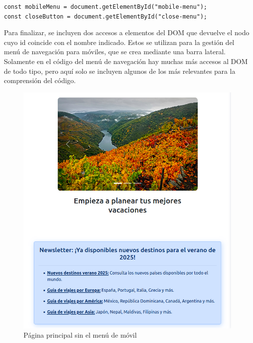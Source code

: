 \documentclass[11pt, a4paper]{book}
\begin{document}
	
	\begin{lstlisting}
const mobileMenu = document.getElementById("mobile-menu");
const closeButton = document.getElementById("close-menu");
	\end{lstlisting}

	Para finalizar, se incluyen dos accesos a elementos del DOM que devuelve el nodo cuyo id coincide con el nombre indicado. Estos se utilizan para la gestión del menú de navegación para móviles, que se crea mediante una barra lateral. Solamente en el código del menú de navegación hay muchas más accesos al DOM de todo tipo, pero aquí solo se incluyen algunos de los más relevantes para la comprensión del código.
	
	\begin{figure} [H]
		\centering
		\includegraphics[height=0.4\textheight]{CSS/1-5 768cut.png}
		\caption{Página principal sin el menú de móvil}
	\end{figure}
\end{document}

